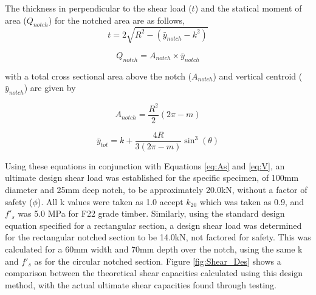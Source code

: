 \documentclass[11pt,a4paper]{article}
\numberwithin{equation}{subsection}
\begin{document}
	\vspace*{\baselineskip}
	\noindent
	The thickness in perpendicular to the shear load ($t$) and the statical moment of area ($Q_{notch}$) for the notched area are as follows, 
	\begin{equation}
	t = 2\sqrt{R^{2}-( \bar y_{notch}-k^{2})}
	\end{equation}
	
	\begin{equation}
	Q_{notch} = A_{notch} \times \bar y_{notch}
	\end{equation}
	
	\noindent
	with a total cross sectional area above the notch ($A_{notch}$) and vertical centroid ($\bar{y}_{notch}$) are given by
	
	\begin{equation}
	A_{notch} = \frac{R^{2}}{2}(2\pi-m)
	\end{equation}
	
	\begin{equation}
	\bar y_{tot} = k + \frac{4R}{3(2\pi-m)}\sin^{3}(\theta)
	\end{equation}

\noindent
Using these equations in conjunction with Equations \ref{eq:As} and \ref{eq:V}, an ultimate design shear load was established for the specific specimen, of 100mm diameter and 25mm deep notch, to be approximately 20.0kN, without a factor of safety ($\phi$). All k values were taken as 1.0 accept $k_{20}$ which was taken as 0.9, and $f'_{s}$ was 5.0 MPa for F22 grade timber. Similarly, using the standard design equation specified for a rectangular section, a design shear load was determined for the rectangular notched section to be 14.0kN, not factored for safety. This was calculated for a 60mm width and 70mm depth over the notch, using the same k and $f'_{s}$ as for the circular notched section. Figure \ref{fig:Shear_Des} shows a comparison between the theoretical shear capacities calculated using this design method, with the actual ultimate shear capacities found through testing.

\vspace*{\baselineskip}
\end{document}
